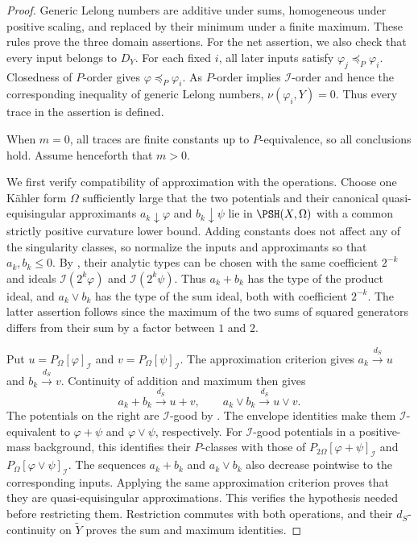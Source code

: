 \begin{proof}
Generic Lelong numbers are additive under sums, homogeneous under
positive scaling, and replaced by their minimum under a finite maximum.
These rules prove the three domain assertions.
For the net assertion, we also check that every input belongs to $D_Y$.
For each fixed $i$, all later inputs satisfy
$\varphi_j\preceq_P\varphi_i$.
Closedness of $P$-order gives $\varphi\preceq_P\varphi_i$.
As $P$-order implies $\mathcal I$-order and hence the corresponding
inequality of generic Lelong numbers, $\nu(\varphi_i,Y)=0$.
Thus every trace in the assertion is defined.

When $m=0$, all traces
are finite constants up to $P$-equivalence, so all conclusions hold.
Assume henceforth that $m>0$.

We first verify compatibility of approximation with the operations.
Choose one K\"ahler form $\Omega$ sufficiently large that the two
potentials and their canonical quasi-equisingular approximants
$a_k\downarrow\varphi$ and $b_k\downarrow\psi$ lie in
$\PSH(X,\Omega)$ with a common strictly positive curvature lower
bound.  Adding constants does not affect any of the singularity classes,
so normalize the inputs and approximants so that $a_k,b_k\leq0$.
By \cite[Theorem~1.6.2]{XiaBook}, their analytic types can be chosen
with the same coefficient $2^{-k}$ and ideals
$\mathcal I(2^k\varphi)$ and $\mathcal I(2^k\psi)$.
Thus $a_k+b_k$ has the type of the product ideal, and $a_k\vee b_k$
has the type of the sum ideal, both with coefficient $2^{-k}$.
The latter assertion follows since the maximum of the two sums of
squared generators differs from their sum by a factor between $1$ and $2$.

Put $u=P_\Omega[\varphi]_{\mathcal I}$ and
$v=P_\Omega[\psi]_{\mathcal I}$.
The approximation criterion \cite[Corollary~7.1.2]{XiaBook} gives
$a_k\xrightarrow{d_S}u$ and $b_k\xrightarrow{d_S}v$.
Continuity of addition and maximum
\cite[Theorem~6.2.2 and Proposition~6.2.4]{XiaBook} then gives
\[
 a_k+b_k\xrightarrow{d_S}u+v,\qquad
 a_k\vee b_k\xrightarrow{d_S}u\vee v.
\]
The potentials on the right are $\mathcal I$-good by
\cite[Proposition~7.2.1]{XiaBook}.  The envelope identities
\cite[Proposition~3.2.11]{XiaBook} make them $\mathcal I$-equivalent
to $\varphi+\psi$ and $\varphi\vee\psi$, respectively.
For $\mathcal I$-good potentials in a positive-mass background,
this identifies their $P$-classes with those of
$P_{2\Omega}[\varphi+\psi]_{\mathcal I}$ and
$P_\Omega[\varphi\vee\psi]_{\mathcal I}$.
The sequences $a_k+b_k$ and $a_k\vee b_k$ also decrease pointwise
to the corresponding inputs.  Applying the same approximation
criterion proves that they are quasi-equisingular approximations.
This verifies the hypothesis needed before restricting them.
Restriction commutes with both operations, and their $d_S$-continuity
on $\widetilde Y$ proves the sum and maximum identities.


\end{proof}
